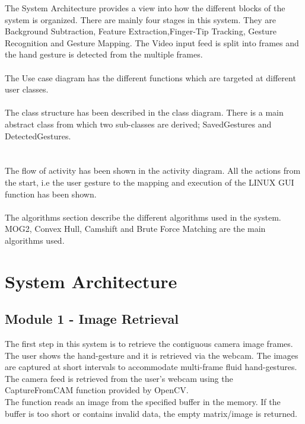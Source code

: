 \documentclass{scrreprt}
\begin{document}
The System Architecture provides a view into how the different blocks of the system is organized.
There are mainly four stages in this system. They are Background Subtraction, Feature Extraction,Finger-Tip Tracking, Gesture Recognition and Gesture Mapping.
The Video input feed is split into frames and the hand gesture is detected from the multiple frames.
\\
\\
The Use case diagram has the different functions which are targeted at different user classes.
\\
\\
The class structure has been described in the class diagram. There is a main abstract class from which two 
sub-classes are derived; SavedGestures and DetectedGestures. \\
\\
\\
The flow of activity has been shown in the activity diagram. All the actions from the start, i.e the user gesture to the mapping and execution of the LINUX GUI function has been shown.
\\
\\
The algorithms section describe the different algorithms used in the system.
MOG2, Convex Hull, Camshift and Brute Force Matching are the main algorithms used.
  


\chapter{System Architecture}

\section{Module 1 - Image Retrieval}
The first step in this system is to retrieve the contiguous camera image frames. The user shows the hand-gesture 
and it is retrieved via the webcam. The images are captured at short intervals to accommodate multi-frame fluid hand-gestures.
\\
The camera feed is retrieved from the user's webcam using the CaptureFromCAM function provided by OpenCV.
\\
The function reads an image from the specified buffer in the memory. If the buffer is too short or contains invalid data, the empty matrix/image is returned.
\end{document}
